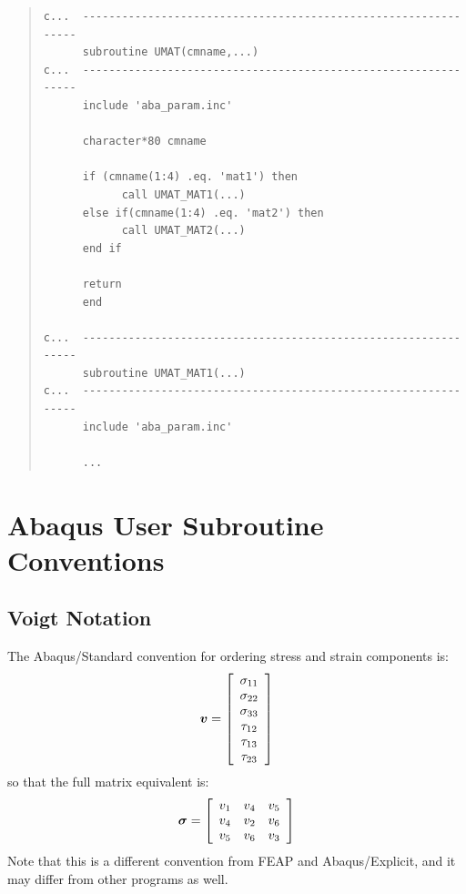 \documentclass[10pt,letterpaper,oneside]{report}
\newcommand{\ten}[1]{\mbox{\boldmath $#1$}{}}
\begin{document}
\newpage
\begin{quote} \begin{lstlisting}
c...  ---------------------------------------------------------------
      subroutine UMAT(cmname,...)
c...  ---------------------------------------------------------------
      include 'aba_param.inc'
      
      character*80 cmname

      if (cmname(1:4) .eq. 'mat1') then
            call UMAT_MAT1(...)
      else if(cmname(1:4) .eq. 'mat2') then
            call UMAT_MAT2(...)
      end if

      return
      end

c...  ---------------------------------------------------------------
      subroutine UMAT_MAT1(...)
c...  ---------------------------------------------------------------
      include 'aba_param.inc'

      ...
\end{lstlisting} \end{quote}

\section{Abaqus User Subroutine Conventions}

\subsection{Voigt Notation}
The Abaqus/Standard convention for ordering stress and strain components is:
\[ \ten{v} = \left[ \begin{array}{c}
\sigma_{11} \\ \sigma_{22} \\ \sigma_{33} \\
\tau_{12} \\ \tau_{13} \\ \tau_{23}
\end{array} \right] \] 
so that the full matrix equivalent is: 
\[ \ten{\sigma} = 
\left[ \begin{array}{ccc}
v_1 & v_4 & v_5 \\
v_4 & v_2 & v_6 \\
v_5 & v_6 & v_3 
\end{array} \right] \] 
Note that this is a different convention from FEAP and Abaqus/Explicit, and it may differ from other programs as well.
\end{document}
